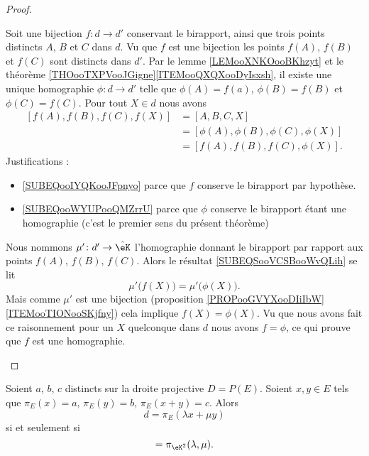 \begin{proof}
\begin{subproof}
            Soit une bijection \( f\colon d\to d'\) conservant le birapport, ainsi que trois points distincts \( A\), \( B\) et \( C\) dans \( d\). Vu que \( f\) est une bijection les points \( f(A)\), \( f(B)\) et \( f(C)\) sont distincts dans \( d'\). Par le lemme \ref{LEMooXNKOooBKhzyt} et le théorème \ref{THOooTXPVooJGigne}\ref{ITEMooQXQXooDyIsxsh}, il existe une unique homographie \( \phi\colon d\to d'\) telle que \( \phi(A)=f(a)\), \( \phi(B)=f(B)\) et \( \phi(C)=f(C)\). Pour tout \( X\in d\) nous avons
            \begin{subequations}        \label{SUBEQSooVCSBooWvQLih}
                \begin{align}
                    [f(A),f(B),f(C),f(X)]&=[A,B,C,X]   \label{SUBEQooIYQKooJFpnyo}\\
                    &=[\phi(A),\phi(B),\phi(C),\phi(X)]     \label{SUBEQooWYUPooQMZrrU}\\
                    &=[f(A),f(B),f(C),\phi(X)].
                \end{align}
            \end{subequations}
            Justifications :
            \begin{itemize}
                \item \eqref{SUBEQooIYQKooJFpnyo} parce que \( f\) conserve le birapport par hypothèse.
                \item \eqref{SUBEQooWYUPooQMZrrU} parce que \( \phi\) conserve le birapport étant une homographie (c'est le premier sens du présent théorème)
            \end{itemize}
            Nous nommons \( \mu'\colon d'\to \hat\eK\) l'homographie donnant le birapport par rapport aux points \( f(A)\), \( f(B)\), \( f(C)\). Alors le résultat \eqref{SUBEQSooVCSBooWvQLih} se lit
            \begin{equation}
                \mu'\big( f(X) \big)=\mu'\big( \phi(X) \big).
            \end{equation}
            Mais comme \( \mu'\) est une bijection (proposition \ref{PROPooGVYXooDIiIbW}\ref{ITEMooTIONooSKjfny}) cela implique \( f(X)=\phi(X)\). Vu que nous avons fait ce raisonnement pour un \( X\) quelconque dans \( d\) nous avons \( f=\phi\), ce qui prouve que \( f\) est une homographie.
    \end{subproof}
\end{proof}

\begin{lemma}
    Soient \( a\), \( b\), \( c\) distincts sur la droite projective \( D=P(E)\). Soient \( x,y\in E\) tels que \( \pi_E(x)=a\), \( \pi_E(y)=b\), \( \pi_E(x+y)=c\). Alors
    \begin{equation}
        d=\pi_E(\lambda x+\mu y)
    \end{equation}
    si et seulement si
    \begin{equation}
        [a,b,c,d]=\pi_{\eK^2}(\lambda,\mu).
    \end{equation}
\end{lemma}

